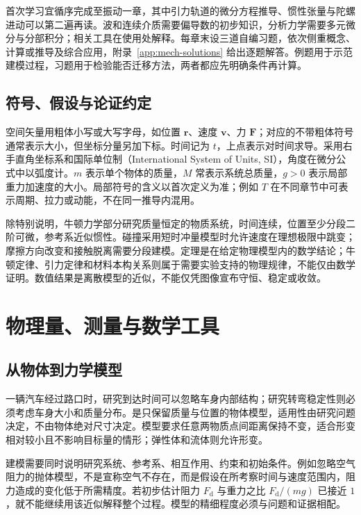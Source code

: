 \documentclass[UTF8,12pt,a4paper,fontset=fandol]{ctexbook}
\begin{document}
首次学习宜循序完成至振动一章，其中引力轨道的微分方程推导、惯性张量与陀螺进动可以第二遍再读。波和连续介质需要偏导数的初步知识，分析力学需要多元微分与分部积分；相关工具在使用处解释。每章末设三道自编习题，依次侧重概念、计算或推导及综合应用，附录~\ref{app:mech-solutions} 给出逐题解答。例题用于示范建模过程，习题用于检验能否迁移方法，两者都应先明确条件再计算。

\section{符号、假设与论证约定}
空间矢量用粗体小写或大写字母，如位置 $\mathbf r$、速度 $\mathbf v$、力 $\mathbf F$；对应的不带粗体符号通常表示大小，但坐标分量另加下标。时间记为 $t$，上点表示对时间求导。采用右手直角坐标系和国际单位制（International System of Units, SI），角度在微分公式中以弧度计。$m$ 表示单个物体的质量，$M$ 常表示系统总质量，$g>0$ 表示局部重力加速度的大小。局部符号的含义以首次定义为准；例如 $T$ 在不同章节中可表示周期、拉力或动能，不在同一推导内混用。

除特别说明，牛顿力学部分研究质量恒定的物质系统，时间连续，位置至少分段二阶可微，参考系近似惯性。碰撞采用短时冲量模型时允许速度在理想极限中跳变；摩擦方向改变和接触脱离需要分段建模。定理是在给定物理模型内的数学结论；牛顿定律、引力定律和材料本构关系则属于需要实验支持的物理规律，不能仅由数学证明。数值结果是离散模型的近似，不能仅凭图像宣布守恒、稳定或收敛。

\mainmatter

\chapter{物理量、测量与数学工具}
\label{chap:mech-tools}

\section{从物体到力学模型}
一辆汽车经过路口时，研究到达时间可以忽略车身内部结构；研究转弯稳定性则必须考虑车身大小和质量分布。是只保留质量与位置的物体模型，适用性由研究问题决定，不由物体绝对尺寸决定。模型要求任意两物质点间距离保持不变，适合形变相对较小且不影响目标量的情形；弹性体和流体则允许形变。

建模需要同时说明研究系统、参考系、相互作用、约束和初始条件。例如忽略空气阻力的抛体模型，不是宣称空气不存在，而是假设在所考察时间与速度范围内，阻力造成的变化低于所需精度。若初步估计阻力 $F_{\mathrm d}$ 与重力之比 $F_{\mathrm d}/(mg)$ 已接近 $1$，就不能继续用该近似解释整个过程。模型的精细程度必须与问题和证据相配。
\end{document}
